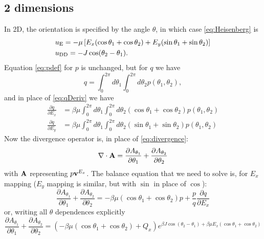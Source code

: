 \documentclass[11pt,reqno]{amsart}
\begin{document}
\subsection{2 dimensions}
In 2D, the orientation is specified by the angle $\theta$, in which case \eqref{eq:Heisenberg} is
\begin{subequations}
\label{eq:Heisenberg2D}
\begin{align}
&u_{\rm E}=-\mu \left[E_x (\cos \theta_1 +\cos\theta_2) + E_y(\sin\theta_1+\sin\theta_2)\right]\\
&u_{\rm DD}= -J\cos(\theta_2-\theta_1).
\end{align}
\end{subequations}
Equation \eqref{eq:pdef} for $p$ is unchanged, but for $q$ we have
\begin{equation}
\label{eq:qdef2D}
q=\int_0^{2\pi} d\theta_1\int_0^{2\pi} d\theta_2 p(\theta_1,\theta_2),
\end{equation}
and in place of \eqref{eq:qDeriv} we have
\begin{subequations}
\begin{align}
\frac{\partial q}{\partial E_x}&=\beta\mu \int_0^{2\pi} d\theta_1\int_0^{2\pi} d\theta_2 (\cos\theta_1 + \cos\theta_2)p(\theta_1,\theta_2)\\
\frac{\partial q}{\partial E_y}&=\beta\mu \int_0^{2\pi} d\theta_1\int_0^{2\pi} d\theta_2 (\sin\theta_1 + \sin\theta_2)p(\theta_1,\theta_2)
\end{align}
\end{subequations}
Now the divergence operator is, in place of \eqref{eq:divergence}:
\begin{equation}
\label{eq:divergence2D}
\nabla\cdot {\bf A} =\frac{\partial A_{\theta_1}}{\partial \theta_1} + \frac{\partial A_{\theta_2}}{\partial \theta_2}
\end{equation}
with ${\bf A}$ representing $p{\bf v}^{E_x}$. The balance equation that we need to solve is, for $E_x$ mapping ($E_y$ mapping is similar, but with $\sin$ in place of $\cos$):
\begin{equation}
\label{eq:balance2D}
\frac{\partial A_{\theta_1}}{\partial \theta_1} + \frac{\partial A_{\theta_2}}{\partial \theta_2} = -\beta\mu(\cos\theta_1+\cos\theta_2)p + \frac{p}{q}\frac{\partial q}{\partial E_x}
\end{equation}
or, writing all $\theta$ dependences explicitly
\begin{equation}
\label{eq:balance2Dfull}
\frac{\partial A_{\theta_1}}{\partial \theta_1} + \frac{\partial A_{\theta_2}}{\partial \theta_2} = \left(-\beta\mu(\cos\theta_1+\cos\theta_2) + Q_x\right)e^{\beta J\cos(\theta_2-\theta_1)+\beta\mu E_x(\cos\theta_1+\cos\theta_2)}
\end{equation}
\end{document}
